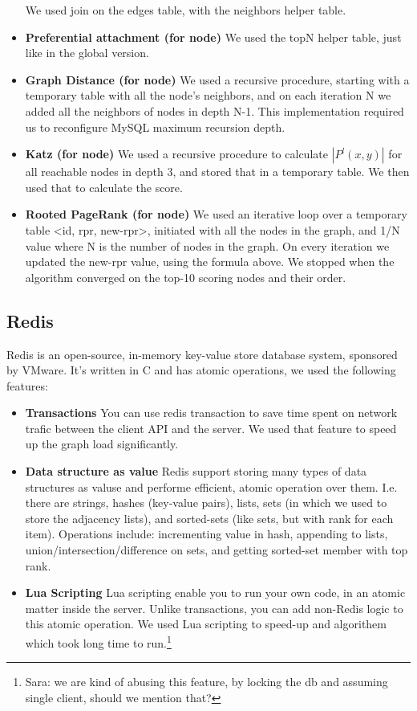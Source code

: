 \begin{itemize}
		We used join on the edges table, with the neighbors helper table.
	\item {\bf Preferential attachment (for node)}
		We used the topN helper table, just like in the global version.
	\item {\bf Graph Distance (for node)}
		We used a recursive procedure, starting with a temporary table with all the node's neighbors,
		and on each iteration N we added all the neighbors of nodes in depth N-1. This implementation
		required us to reconfigure MySQL maximum recursion depth.
	\item {\bf Katz (for node)}
		We used a recursive procedure to calculate $|P^l(x,y)|$ for all reachable nodes in depth 3,
		and stored that in a temporary table. We then used that to calculate the score.
	\item {\bf Rooted PageRank (for node)}
        We used an iterative loop over a temporary table <id, rpr, new-rpr>, initiated with all the 
        nodes in the graph, and 1/N value where N is the number of nodes in the graph. On every 
        iteration we updated the new-rpr value, using the formula above. We stopped when the algorithm
        converged on the top-10 scoring nodes and their order.
\end{itemize}

\subsection{Redis}
Redis is an open-source, in-memory key-value store database system, sponsored
by VMware. It's written in C and has atomic operations, we used the following features:
\begin{itemize}
	\item {\bf Transactions}
        You can use redis transaction to save time spent on network trafic 
        between the client API and the server. We used that feature to speed up
        the graph load significantly.
	\item {\bf Data structure as value}
        Redis support storing many types of data structures as valuse and 
        performe efficient, atomic operation over them. I.e. there are strings,
        hashes (key-value pairs), lists, sets (in which we used to store the 
        adjacency lists), and sorted-sets (like sets, but with rank for each item).
        Operations include: incrementing value in hash, appending to lists, 
        union/intersection/difference on sets, and getting sorted-set member with top rank.
	\item {\bf Lua Scripting}
        Lua scripting enable you to run your own code, in an atomic matter inside the server.
        Unlike transactions, you can add non-Redis logic to this atomic operation. We used 
        Lua scripting to speed-up and algorithem which took long time to run.\footnote{Sara: we are kind of abusing this feature, by locking the db and assuming single client, should we mention that?}
\end{itemize}

